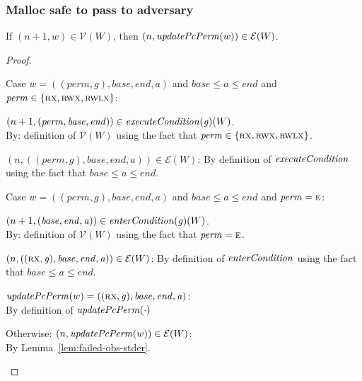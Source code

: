 \documentclass[a4paper]{article}
\newcommand{\var}[1]{\mathit{#1}}
\newcommand{\gl}{\var{g}}
\newcommand{\addr}{\var{a}}
\newcommand{\start}{\var{base}}
\newcommand{\addrend}{\var{end}}
\newcommand{\perm}{\var{perm}}
\newcommand{\stdcap}[1][(\perm,\gl)]{\left(#1,\start,\addrend,\addr \right)}
\newcommand{\plainfun}[2]{
  \ifthenelse{\equal{#2}{}}
  {\mathit{#1}}
  {\mathit{#1}(#2)}
}
\newcommand{\updatePcPerm}[1]{\plainfun{updatePcPerm}{#1}}
\newcommand{\execCond}[1]{\plainfun{executeCondition}{#1}}
\newcommand{\entryCond}[1]{\plainfun{enterCondition}{#1}}
\newcommand{\asmType}{\plaindom{AsmType}}
\newcommand{\plaindom}[1]{\mathrm{#1}}
\newcommand{\intr}[2]{\mathcal{#1}}
\newcommand{\valueintr}[1]{\intr{V}{#1}}
\newcommand{\exprintr}[1]{\intr{E}{#1}}
\newcommand{\stdvr}{\valueintr{\asmType}}
\newcommand{\stder}{\exprintr{\asmType}}
\newcommand{\npair}[2][n]{\left(#1,#2 \right)}
\newcommand{\plainperm}[1]{\textsc{#1}}
\newcommand{\exec}{\plainperm{rx}}
\newcommand{\entry}{\plainperm{e}}
\newcommand{\rwx}{\plainperm{rwx}}
\newcommand{\rwlx}{\plainperm{rwlx}}
\begin{document}
\subsubsection{Malloc safe to pass to adversary}
\label{sec:malloc-valrel}

\begin{lemma}
  \label{lem:safe-values-safe-invoke}
  If $\npair[n+1]{w} \in \stdvr(W)$, then $\npair{\updatePcPerm{w}} \in \stder(W)$.
\end{lemma}
\begin{proof}
  \begin{enumproof}
  \item Case $w = \stdcap$ and $\start \leq \addr \leq \addrend$
    and $\perm \in \{ \exec,\rwx, \rwlx \}$:
    \begin{enumproof}
    \item $\npair[n+1]{(\perm,\start,\addrend)}\in\execCond{\gl}(W)$.\\
      By: definition of $\stdvr(W)$ using the fact that $\perm \in \{ \exec,\rwx, \rwlx \}$.
    \item $\npair[n]{((\perm,\gl),\start,\addrend,\addr)} \in \stder(W)$:
      By definition of $\execCond{}$ using the fact that $\start \leq \addr \leq \addrend$.
    \end{enumproof}
  \item Case $w = \stdcap$ and $\start \leq \addr \leq \addrend$
    and $\perm = \entry$:
    \begin{enumproof}
    \item $\npair[n+1]{(\start,\addrend,\addr)}\in\entryCond{\gl}(W)$.\\
      By: definition of $\stdvr(W)$ using the fact that $\perm = \entry$.
    \item $\npair[n]{((\exec,\gl),\start,\addrend,\addr)} \in \stder(W)$:
      By definition of $\entryCond{}$ using the fact that $\start \leq \addr \leq \addrend$.
    \item $\updatePcPerm{w} = ((\exec,\gl),\start,\addrend,\addr)$:\\
      By definition of $\updatePcPerm{\cdot}$
    \end{enumproof}
  \item Otherwise:
    $\npair{\updatePcPerm{w}} \in \stder(W)$:\\
    By Lemma~\ref{lem:failed-obs-stder}.
  \end{enumproof}
\end{proof}
\end{document}
